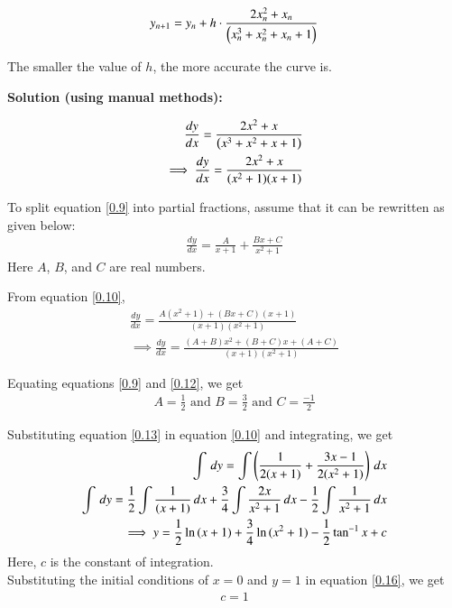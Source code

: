 \documentclass[journal]{IEEEtran}
\begin{document}
\begin{align}
y_{n+1} = y_n + h\cdot\frac{2x_n^2 + x_n}{\left(x_n^3 + x_n^2 + x_n + 1\right)}
\end{align}

The smaller the value of $h$, the more accurate the curve is. 

\newpage

\textbf{Solution (using manual methods):}

\begin{align}
\frac{dy}{dx} = \frac{2x^2 + x}{\left(x^3 + x^2 + x + 1\right)} \\
\implies \frac{dy}{dx} = \frac{2x^2 + x}{(x^2+1)(x+1)}
\label{0.9}
\end{align}

To split equation \eqref{0.9} into partial fractions, assume that it can be rewritten as given below:
\begin{align}
\frac{dy}{dx} = \frac{A}{x+1} + \frac{Bx + C}{x^2 + 1}
\label{0.10}
\end{align}
Here $A$, $B$, and $C$ are real numbers.

From equation \eqref{0.10},
\begin{align}
\frac{dy}{dx} = \frac{A(x^2+1) + (Bx+C)(x+1)}{(x+1)(x^2+1)} \\
\implies \frac{dy}{dx} = \frac{(A+B)x^2 + (B+C)x + (A+C)}{(x+1)(x^2+1)}
\label{0.12}
\end{align}

Equating equations \eqref{0.9} and \eqref{0.12}, we get
\begin{align}
A = \frac{1}{2} \text{ and } B = \frac{3}{2} \text{ and } C = \frac{-1}{2}
\label{0.13}
\end{align}

Substituting equation \eqref{0.13} in equation \eqref{0.10} and integrating, we get
\begin{align}
\int \,dy = \int \left(\frac{1}{2(x+1)} + \frac{3x - 1}{2(x^2 + 1)}\right) \,dx \\
\int \,dy = \frac{1}{2}\int\frac{1}{(x+1)}\,dx + \frac{3}{4}\int\frac{2x}{x^2+1}\,dx - \frac{1}{2}\int\frac{1}{x^2+1}\,dx \\
\implies y = \frac{1}{2}\ln{(x+1)} + \frac{3}{4}\ln{(x^2+1)} - \frac{1}{2}\tan^{-1}{x} + c
\label{0.16}
\end{align}
Here, $c$ is the constant of integration. \\
Substituting the initial conditions of $x=0$ and $y=1$ in equation \eqref{0.16}, we get
\begin{align}
c = 1
\end{align}
\end{document}
